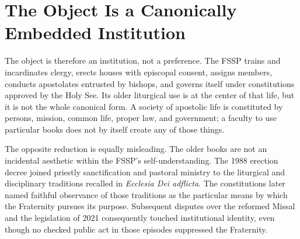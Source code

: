 \section{The Object Is a Canonically Embedded Institution}


The object is therefore an institution, not a preference. The FSSP trains and incardinates clergy, erects houses with episcopal consent, assigns members, conducts apostolates entrusted by bishops, and governs itself under constitutions approved by the Holy See. Its older liturgical use is at the center of that life, but it is not the whole canonical form. A society of apostolic life is constituted by persons, mission, common life, proper law, and government; a faculty to use particular books does not by itself create any of those things.

The opposite reduction is equally misleading. The older books are not an incidental aesthetic within the FSSP's self-understanding. The 1988 erection decree joined priestly sanctification and pastoral ministry to the liturgical and disciplinary traditions recalled in \emph{Ecclesia Dei adflicta}. The constitutions later named faithful observance of those traditions as the particular means by which the Fraternity pursues its purpose. Subsequent disputes over the reformed Missal and the legislation of 2021 consequently touched institutional identity, even though no checked public act in those episodes suppressed the Fraternity.
